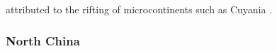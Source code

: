 \documentclass[twocolumn, switch]{article} %
\begin{document}
attributed to the rifting of microcontinents such as Cuyania \citep{Martin2019a}.


\subsubsection{North China}
\end{document}
